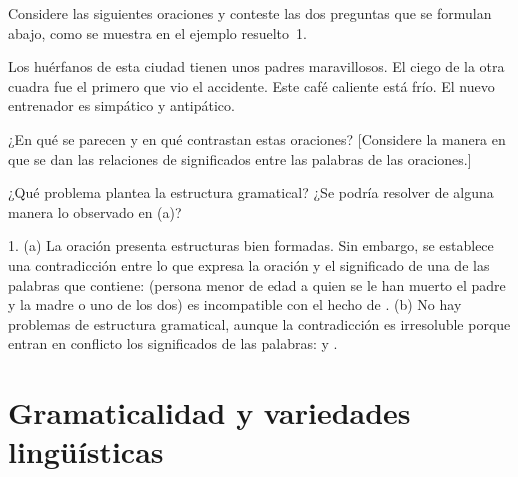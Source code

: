 \begin{ejercicio}\label{ej:02-contradiccion}
Considere las siguientes oraciones y conteste las dos preguntas que se formulan
abajo, como se muestra en el ejemplo resuelto~1.

\begin{exe}
  \ex Los huérfanos de esta ciudad tienen unos padres maravillosos.
  \ex El ciego de la otra cuadra fue el primero que vio el accidente.
   Este café caliente está frío.
  \ex El nuevo entrenador es simpático y antipático.
\end{exe}

\begin{consignas}
  \item ¿En qué se parecen y en qué contrastan estas oraciones? [Considere la
        manera en que se dan las relaciones de significados entre las palabras
        de las oraciones.]
  \item ¿Qué problema plantea la estructura gramatical? ¿Se podría resolver de
        alguna manera lo observado en (a)?
\end{consignas}

\begin{resuelto}
1. (a) La oración presenta estructuras bien formadas. Sin embargo, se establece
una contradicción entre lo que expresa la oración y el significado de una de las
palabras que contiene:  (persona menor de edad a quien se le han
muerto el padre y la madre o uno de los dos) es incompatible con el hecho de
. (b) No hay problemas de estructura
gramatical, aunque la contradicción es irresoluble porque entran en conflicto
los significados de las palabras:  y .
\end{resuelto}
\end{ejercicio}

\section{Gramaticalidad y variedades lingüísticas}

